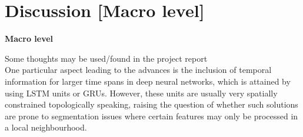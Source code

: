 
\chapter{Discussion [Macro level]}\label{chpt:discussion}
\textbf{Macro level}

Some thoughts may be used/found in the project report
\\

One particular aspect leading to the advances is the inclusion of temporal information for larger time spans in deep neural networks, which is attained by using LSTM units or GRUs. However, these units are usually very spatially constrained topologically speaking, raising the question of whether such solutions are prone to segmentation issues where certain features may only be processed in a local neighbourhood.

\cleardoublepage
